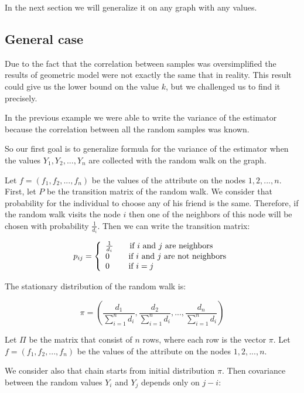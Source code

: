 \documentclass[12pt]{report}
\begin{document}
In the next section we will generalize it on any graph with any values.
\subsection{General case}

Due to the fact that the correlation between samples was oversimplified the results of geometric model were not exactly the same that in reality. This result could give us the lower bound on the value $k$, but we challenged us to find it precisely. 

In the previous example we were able to write the variance of the estimator because the correlation between all the random samples was known. 

So our first goal is to generalize formula for the variance of the estimator when the values $Y_1, Y_2, ..., Y_n$ are collected with the random walk on the graph.

Let $f = (f_1 , f_2, ..., f_n)$ be the values of the attribute on the nodes $1, 2, ..., n$.
First, let $P$ be the transition matrix of the random walk. We consider that probability for the individual to choose any of his friend is the same. Therefore, if the random walk visits the node $i$ then one of the neighbors of this node will be chosen with probability $\frac{1}{d_i}$. Then we can write the transition matrix:


\[
    p_{ij}=\left\{
                \begin{array}{ll}
                  \frac{1}{d_i} \qquad \textnormal{if $i$ and $j$ are neighbors} \\
                  0 \qquad \textnormal{ if $i$ and $j$ are not neighbors}\\
                  0 \qquad \textnormal{ if $i = j$}
                \end{array}
              \right.
  \]
  
The stationary distribution of the random walk is:

$$\pi = \left( \frac{d_1}{\sum_{i=1}^n d_i}, \frac{d_2}{\sum_{i=1}^n d_i},..., \frac{d_n}{\sum_{i=1}^n d_i}\right)$$
  

Let $\Pi$ be the matrix that consist of $n$ rows, where each row is the vector $\pi$. Let $f = (f_1 , f_2, ..., f_n)$ be the values of the attribute on the nodes $1, 2, ..., n$.

We consider also that chain starts from initial distribution $\pi$. Then covariance between the random values $Y_i$ and $Y_j$ depends only on $j-i$:
\end{document}
